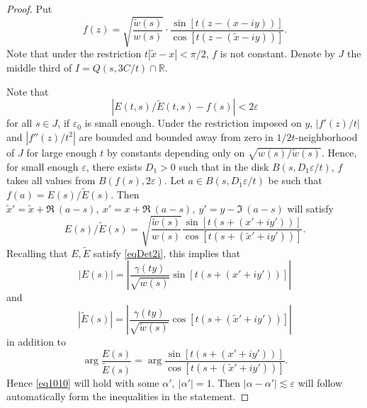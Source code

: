 \documentclass[11pt,twoside,reqno]{amsart}
\def\ti{\tilde}
\def\R{{\mathbb R}}
\def\e{\varepsilon}
\def\g{\gamma}
\def\a{\alpha}
\theoremstyle{plain}
\numberwithin{equation}{section}
\begin{document}
\begin{proof}
Put $$f(z)=\sqrt{\frac{\ti w(s)}{w(s)}}\cdot \frac{\sin[t(z-(x -iy))]}{\cos[t(z-(\ti x -iy))]}.$$
Note that under the restriction $t|\ti x-x|<\pi/2$, $f$ is not constant. Denote by $J$ the middle third of $I=Q(s,3C/t)\cap \R $.

Note that
$$|E(t,s)/\ti E(t,s)-f(s)|<2\e$$
for all $s\in J$, if $\e_0$ is small enough.
Under the restriction imposed on $y$, $|f'(z)/t|$ and $|f''(z)/t^2|$
are bounded and bounded away from zero in $1/2t$-neighborhood of $J$ for large enough $t$
by  constants depending only on  $\sqrt{w(s)/\ti w(s)}$.
Hence, for  small enough $\e$, there exists $D_1>0$ such that in the disk $B(s,D_1\e/t)$,
$f$ takes all values from $B(f(s),2\e)$. Let $a\in B(s,D_1\e/t)$ be such that
$f(a)=E(s)/\ti E(s)$. Then $\ti x' =\ti x +\Re\  (a-s),\ x' =x +\Re\  (a-s),\ y'=y-\Im\  (a-s)$ will satisfy
$$E(s)/\ti E(s)=\sqrt{\frac{\ti w(s)}{w(s)}}\frac{\sin[t(s+(x' +iy'))]}{\cos[t(s+(\ti x' +iy'))]}.$$
Recalling that $E,\ti E$ satisfy \eqref{eqDet2i}, this implies that
$$|E(s)|=\left|\frac{\g(ty)}{\sqrt{w(s)}}\sin[t(s+(x' +iy'))]\right|$$ and $$|\ti E(s)|=\left|\frac{\g(ty)}{\sqrt{\ti w(s)}}\cos[t(s+(\ti x' +iy'))]\right|
$$
in addition to
$$\arg \frac {E(s)}{\ti E(s)}=\arg  \frac{\sin[t(s+(x' +iy'))] }{ \cos[t(s+(\ti x' +iy'))]}.$$
Hence \eqref{eq1010} will hold with some $\alpha',\ |\a'|=1$. Then  $|\a-\a'|\lesssim\e$ will follow automatically form the inequalities in the statement.


\end{proof}
\end{document}
